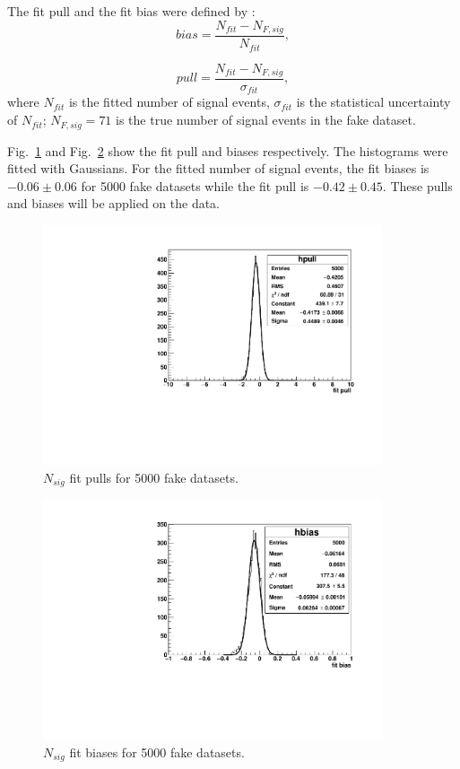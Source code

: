 The fit pull and the fit bias were defined by \cite{leta}:
\begin{equation}
bias=\frac{N_{fit}-N_{F,sig}}{N_{fit}},
\end{equation}

\begin{equation}
pull=\frac{N_{fit}-N_{F,sig}}{\sigma_{fit}},
\end{equation}
where $N_{fit}$ is the fitted number of signal events, $\sigma_{fit}$ is the statistical uncertainty of $N_{fit}$; $N_{F,sig}=71$ is the true number of signal events in the fake dataset.

Fig.~\ref{poisson_fitPull} and Fig.~\ref{poisson_fitBias} show the fit pull and biases respectively. The histograms were fitted with Gaussians. For the fitted number of signal events, the fit biases is $-0.06\pm0.06$ for 5000 fake datasets while the fit pull is $-0.42\pm0.45$. These pulls and biases will be applied on the data.

\begin{figure}[!htb]
	\centering
	\includegraphics[width=10cm]{ensemble_fitPull.pdf}
	\caption{$N_{sig}$ fit pulls for 5000 fake datasets.}
	\label{poisson_fitPull}
\end{figure} 

\begin{figure}[!htb]
	\centering
	\includegraphics[width=10cm]{ensemble_fitBias.pdf}
	\caption{$N_{sig}$ fit biases for 5000 fake datasets.}
	\label{poisson_fitBias}
\end{figure} 

